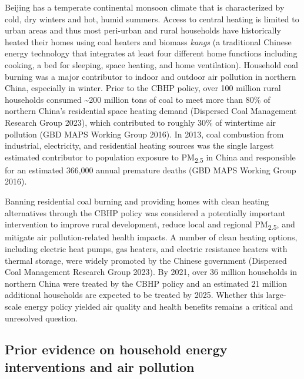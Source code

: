 \documentclass[
  letterpaper,
  DIV=11,
  numbers=noendperiod]{scrartcl}
\begin{document}
Beijing has a temperate continental monsoon climate that is
characterized by cold, dry winters and hot, humid summers. Access to
central heating is limited to urban areas and thus most peri-urban and
rural households have historically heated their homes using coal heaters
and biomass \emph{kangs} (a traditional Chinese energy technology that
integrates at least four different home functions including cooking, a
bed for sleeping, space heating, and home ventilation). Household coal
burning was a major contributor to indoor and outdoor air pollution in
northern China, especially in winter. Prior to the CBHP policy, over 100
million rural households consumed \textasciitilde200 million tons of
coal to meet more than 80\% of northern China's residential space
heating demand (Dispersed Coal Management Research Group 2023), which
contributed to roughly 30\% of wintertime air pollution (GBD MAPS
Working Group 2016). In 2013, coal combustion from industrial,
electricity, and residential heating sources was the single largest
estimated contributor to population exposure to PM\textsubscript{2.5} in
China and responsible for an estimated 366,000 annual premature deaths
(GBD MAPS Working Group 2016).

Banning residential coal burning and providing homes with clean heating
alternatives through the CBHP policy was considered a potentially
important intervention to improve rural development, reduce local and
regional PM\textsubscript{2.5}, and mitigate air pollution-related
health impacts. A number of clean heating options, including electric
heat pumps, gas heaters, and electric resistance heaters with thermal
storage, were widely promoted by the Chinese government (Dispersed Coal
Management Research Group 2023). By 2021, over 36 million households in
northern China were treated by the CBHP policy and an estimated 21
million additional households are expected to be treated by 2025.
Whether this large-scale energy policy yielded air quality and health
benefits remains a critical and unresolved question.

\hypertarget{prior-evidence-on-household-energy-interventions-and-air-pollution}{%
\subsection{Prior evidence on household energy interventions and air
pollution}\label{prior-evidence-on-household-energy-interventions-and-air-pollution}}
\end{document}
